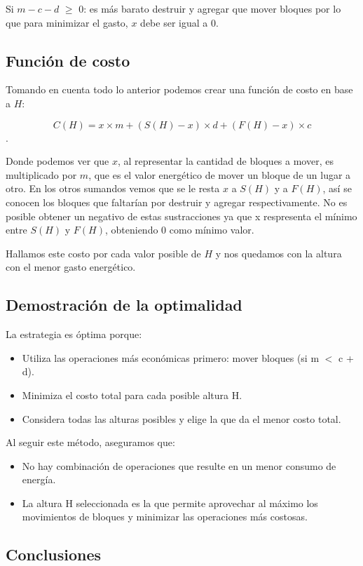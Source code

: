 \documentclass[a4paper,12pt]{article}
\begin{document}
Si \(m - c - d \) $\geq$ \(0\): es más barato destruir y agregar que mover bloques por lo que para minimizar el gasto, \(x\) debe ser igual a \(0\).

\subsection{Función de costo}

Tomando en cuenta todo lo anterior podemos crear una función de costo en base a \(H\):

\[C(H) =  x \times m + (S(H) -  x) \times d + (F(H) - x) \times c\].

Donde podemos ver que \(x\), al representar la cantidad de bloques a mover, es multiplicado por \(m\), que es el valor energético de mover un bloque de un lugar a otro. En los otros sumandos vemos que se le resta \(x\) a \(S(H)\) y a \(F(H)\), así se conocen los bloques que faltarían por destruir y agregar respectivamente. No es posible obtener un negativo de estas sustracciones ya que x respresenta el mínimo entre \(S(H)\) y \(F(H)\), obteniendo 0 como mínimo valor.

Hallamos este costo por cada valor posible de \(H\) y nos quedamos con la altura con el menor gasto energético.

\subsection{Demostración de la optimalidad}
La estrategia es óptima porque:
\begin{itemize}
	\item Utiliza las operaciones más económicas primero: mover bloques (si m $<$ c + d).
	\item Minimiza el costo total para cada posible altura H.
	\item Considera todas las alturas posibles y elige la que da el menor costo total.
\end{itemize}

Al seguir este método, aseguramos que:

\begin{itemize}
	\item No hay combinación de operaciones que resulte en un menor consumo de energía.
	\item La altura H seleccionada es la que permite aprovechar al máximo los movimientos de bloques y minimizar las operaciones más costosas.
\end{itemize}

\subsection{Conclusiones}
\end{document}
